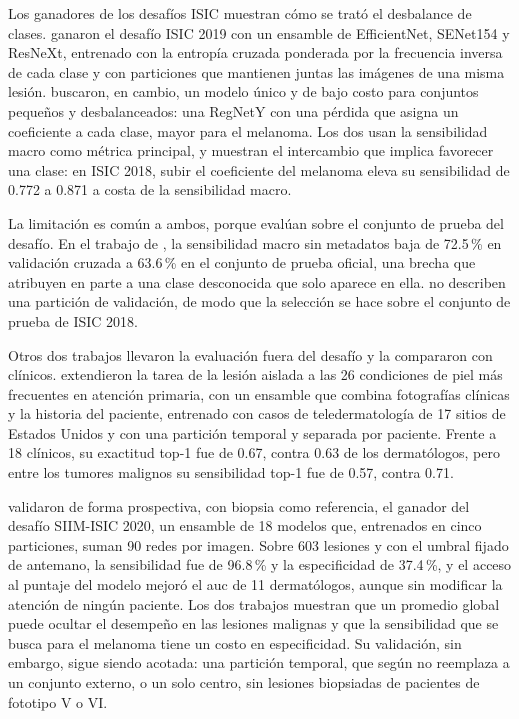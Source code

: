 Los ganadores de los desafíos ISIC muestran cómo se trató el desbalance de clases. \textcite{gessert2020skin}
ganaron el desafío ISIC 2019 con un ensamble de EfficientNet, SENet154 y ResNeXt, entrenado con la entropía cruzada
ponderada por la frecuencia inversa de cada clase y con particiones que mantienen juntas las imágenes de una misma
lesión. \textcite{yao2022single} buscaron, en cambio, un modelo único y de bajo costo para conjuntos pequeños y
desbalanceados: una RegNetY con una pérdida que asigna un coeficiente a cada clase, mayor para el melanoma. Los dos
usan la sensibilidad macro como métrica principal, y \citeauthor{yao2022single} muestran el intercambio que implica
favorecer una clase: en ISIC 2018, subir el coeficiente del melanoma eleva su sensibilidad de 0.772 a 0.871 a costa
de la sensibilidad macro.

La limitación es común a ambos, porque evalúan sobre el conjunto de prueba del desafío. En el trabajo
de \citeauthor{gessert2020skin}, la sensibilidad macro sin metadatos baja de 72.5\,\% en validación cruzada a
63.6\,\% en el conjunto de prueba oficial, una brecha que atribuyen en parte a una clase desconocida que solo aparece en ella.
\citeauthor{yao2022single} no describen una partición de validación, de modo que la selección se hace sobre el conjunto de prueba de ISIC 2018.

Otros dos trabajos llevaron la evaluación fuera del desafío y la compararon con clínicos. \textcite{liu2020deep}
extendieron la tarea de la lesión aislada a las 26 condiciones de piel más frecuentes en atención primaria, con un
ensamble que combina fotografías clínicas y la historia del paciente, entrenado con casos de teledermatología de 17
sitios de Estados Unidos y con una partición temporal y separada por paciente. Frente a 18 clínicos, su exactitud
top-1 fue de 0.67, contra 0.63 de los dermatólogos, pero entre los tumores malignos su sensibilidad top-1 fue de
0.57, contra 0.71.

\textcite{marchetti2023prospective} validaron de forma prospectiva, con biopsia como referencia,
el ganador del desafío SIIM-ISIC 2020, un ensamble de 18 modelos que, entrenados en cinco particiones, suman 90
redes por imagen. Sobre 603 lesiones y con el umbral fijado de antemano, la sensibilidad fue de 96.8\,\% y la
especificidad de 37.4\,\%, y el acceso al puntaje del modelo mejoró el \gls{auc} de 11 dermatólogos, aunque sin
modificar la atención de ningún paciente. Los dos trabajos muestran que un promedio global puede ocultar el
desempeño en las lesiones malignas y que la sensibilidad que se busca para el melanoma tiene un costo en
especificidad. Su validación, sin embargo, sigue siendo acotada: una partición temporal, que según
\citeauthor{liu2020deep} no reemplaza a un conjunto externo, o un solo centro, sin lesiones biopsiadas de pacientes
de fototipo V o VI.

